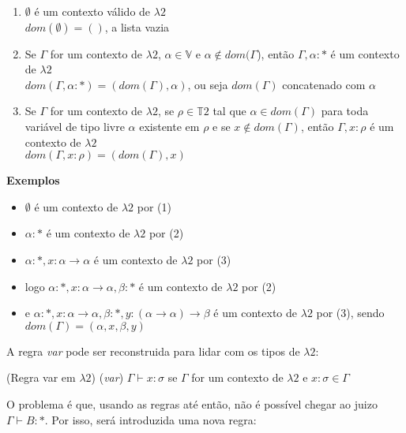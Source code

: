 \documentclass[../main.tex]{subfiles}
\begin{document}
\begin{definition}
    \hfil
    \begin{enumerate}
        \item $\emptyset$ é um contexto válido de $\lambda2$ \\
        $dom(\emptyset) = ()$, a lista vazia
        \item Se $\Gamma$ for um contexto de $\lambda2$, $\alpha \in \mathbb{V}$ e $\alpha \not\in dom(\Gamma$), então $\Gamma, \alpha : \ast$ é um contexto de $\lambda2$ \\
        $dom(\Gamma, \alpha : \ast) = (dom(\Gamma), \alpha)$, ou seja $dom(\Gamma)$ concatenado com $\alpha$
        \item Se $\Gamma$ for um contexto de $\lambda2$, se $\rho \in \mathbb{T}2$ tal que $\alpha \in dom(\Gamma)$ para toda variável de tipo livre $\alpha$ existente em $\rho$ e se $x \not\in dom(\Gamma)$, então $\Gamma, x : \rho$ é um contexto de $\lambda2$ \\
        $dom(\Gamma, x : \rho) = (dom(\Gamma), x)$
    \end{enumerate}
\end{definition}

\textbf{Exemplos}

\begin{itemize}
    \item $\emptyset$ é um contexto de $\lambda2$ por (1)
    \item $\alpha : \ast$ é um contexto de $\lambda2$ por (2)
    \item $\alpha : \ast, x : \alpha \to \alpha$ é um contexto de $\lambda2$ por (3)
    \item logo $\alpha : \ast, x : \alpha \to \alpha, \beta : \ast$ é um contexto de $\lambda2$ por (2)
    \item e $\alpha : \ast, x : \alpha \to \alpha, \beta : \ast, y : (\alpha \to \alpha) \to \beta$ é um contexto de $\lambda2$ por (3), sendo $dom(\Gamma) = (\alpha, x, \beta, y)$
\end{itemize}

A regra \emph{var} pode ser reconstruida para lidar com os tipos de $\lambda2$:

\begin{definition} (Regra var em $\lambda2$)
    \hfil
    (\emph{var}) $\Gamma \vdash x : \sigma$ se $\Gamma$ for um contexto de $\lambda2$ e $x : \sigma \in \Gamma$
\end{definition}

O problema é que, usando as regras até então, não é possível chegar ao juizo $\Gamma \vdash B : \ast$. Por isso, será introduzida uma nova regra:
\end{document}
